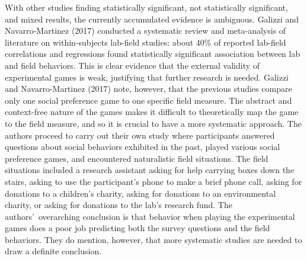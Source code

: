 \documentclass[12pt]{article}
\begin{document}
With other studies finding statistically significant, not statistically significant, and mixed results, the currently accumulated evidence is ambiguous. Galizzi and Navarro-Martinez (2017) conducted a systematic review and meta-analysis of literature on within-subjects lab-field studies: about 40\% of reported lab-field correlations and regressions found statistically significant association between lab and field behaviors. This is clear evidence that the external validity of experimental games is weak, justifying that further research is needed. Galizzi and Navarro-Martinez (2017) note, however, that the previous studies compare only one social preference game to one specific field measure. The abstract and context-free nature of the games makes it difficult to theoretically map the game to the field measure, and so it is crucial to have a more systematic approach. The authors proceed to carry out their own study where participants answered questions about social behaviors exhibited in the past, played various social preference games, and encountered naturalistic field situations. The field situations included a research assistant asking for help carrying boxes down the stairs, asking to use the participant\rq s phone to make a brief phone call, asking for donations to a children\rq s charity, asking for donations to an environmental charity, or asking for donations to the lab\rq s research fund.  The authors\rq \ overarching conclusion is that behavior when playing the experimental games does a poor job predicting both the survey questions and the field behaviors. They do mention, however, that more systematic studies are needed to draw a definite conclusion.
\end{document}
